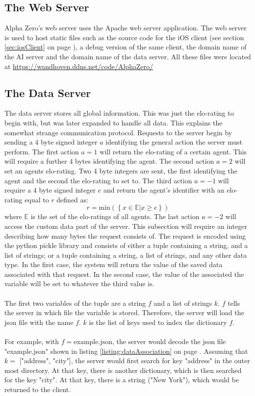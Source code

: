 \documentclass[12pt]{article}
\newcommand{\sectionref}[1]{section \ref{#1} on page \pageref{#1}}
\newcommand{\listingref}[1]{listing \ref{#1} on page \pageref{#1}}
\begin{document}
\subsection{The Web Server}
Alpha Zero's web server uses the Apache web server application. The web server is used to host static files such as the source code for the iOS client (see \sectionref{sec:iosClient}), a debug version of the same client, the domain name of the AI server and the domain name of the data server. All these files were located at \href{https://wandhoven.ddns.net/code/AlphaZero/}{https://wandhoven.ddns.net/code/AlphaZero/}
\subsection{The Data Server}
The data server stores all global information. This was just the elo-rating to begin with, but was later expanded to handle all data. This explains the somewhat strange communication protocol. Requests to the server begin by sending a 4 byte signed integer \(a\) identifying the general action the server must perform. The first action \(a=1\) will return the elo-rating of a certain agent.
This will require a further 4 bytes identifying the agent. The second action \(a=2\) will set an agents elo-rating. Two 4 byte integers are sent, the first identifying the agent and the second the elo-rating to set to. The third action \(a=-1\) will require a 4 byte signed integer \(e\) and return the agent's identifier with an elo-rating equal to \(r\) defined as:
\begin{equation}
r = \text{min}(\left\{x \in\mathbb E | x \geq e \right\})
\end{equation}
where \(\mathbb E\) is the set of the elo-ratings of all agents. The last action \(a=-2\) will access the custom data part of the server. This subsection will require an integer describing how many bytes the request consists of. The request is encoded using the python pickle library and consists of either a tuple containing a string, and a list of strings; or a tuple containing a string, a list of strings, and any other data type. In the first case, the system will return the value of the saved data associated with that request. In the second case, the value of the associated the variable will be set to whatever the third value is.\\\\
The first two variables of the tuple are a string \(f\) and a list of strings \(k\). \(f\) tells the server in which file the variable is stored. Therefore, the server will load the json file with the name \(f\). \(k\) is the list of keys used to index the dictionary \(f\). \\\\
For example, with \(f = \text{example.json}\), the server would decode the json file "example.json" shown in \listingref{listing:dataAssociation}. Assuming that \(k =\) ["address", "city"], the server would first search for key "address" in the outer most directory. At that key, there is another dictionary, which is then searched for the key "city".  At that key, there is a string ("New York"), which would  be returned to the client.
\end{document}
